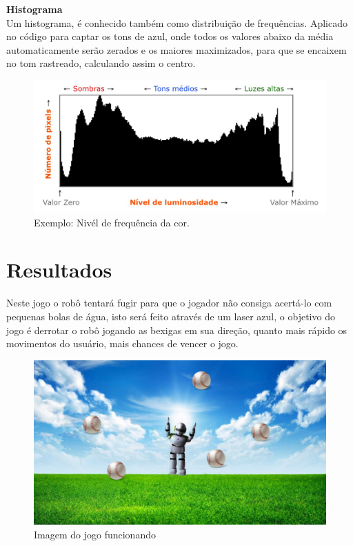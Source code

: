 \documentclass{sciposter}
\begin{document}
\begin{multicols}{3}
\textbf{Histograma} \\

Um histograma, é conhecido também como distribuição de frequências. Aplicado no código para captar os tons de azul, onde todos os valores abaixo da média automaticamente serão zerados e os maiores maximizados, para que se encaixem no tom rastreado, calculando assim o centro.

\begin{figure}[!htb]
\centering
\includegraphics[scale=0.4]{histograma.jpg}
\caption{Exemplo: Nivél de frequência da cor.}
\end{figure}



\section{Resultados }

Neste jogo o robô tentará fugir para que o jogador não consiga acertá-lo com pequenas bolas de água, isto será feito através de um laser azul, o objetivo do jogo é derrotar o robô jogando as bexigas em sua direção, quanto mais rápido os movimentos do usuário, mais chances de vencer o jogo.

\vspace{0.7cm}

\begin{figure}[!htb]
\centering
\includegraphics[scale=0.7]{fundo.jpg}
\caption{Imagem do jogo funcionando}
\end{figure}


\end{multicols}
\end{document}
